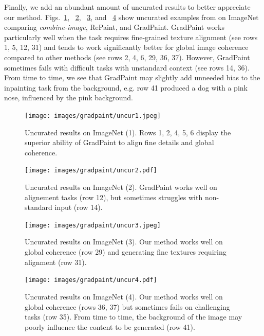  
     Finally, we add an abundant amount of uncurated results to better appreciate our method.
     Figs.~\ref{fig:uncur1}, ~\ref{fig:uncur2}, ~\ref{fig:uncur3}, and ~\ref{fig:uncur4} show uncurated 
     examples from on ImageNet comparing \emph{combine-image}, RePaint, and GradPaint. GradPaint works particularly well when the 
     task requires fine-grained texture alignment (see rows 1, 5, 12, 31)  and tends to work significantly better for global image 
     coherence compared to other methods (see rows 2, 4, 6, 29, 36, 37). However, GradPaint sometimes fails with difficult tasks with 
     unstandard context (see rows 14, 36). From time to time, we see that GradPaint may slightly add unneeded bias to the inpainting 
     task from the background, e.g. row 41 produced a dog with a pink nose, influenced by the pink background. 
  










\begin{figure}[H]
  \centering
    \texttt{[image: images/gradpaint/uncur1.jpeg]} %
    \caption{Uncurated results on ImageNet (1). Rows 1, 2, 4, 5, 6 display the superior ability of GradPaint to align fine details and global coherence.}
    \label{fig:uncur1}
\end{figure}

\begin{figure}[H]
  \centering
    \texttt{[image: images/gradpaint/uncur2.pdf]}
    \caption{Uncurated results on ImageNet (2). GradPaint works well on alignement tasks (row 12), but sometimes struggles with non-standard input (row 14). }
    \label{fig:uncur2}
\end{figure}

\begin{figure}[H]
  \centering
    \texttt{[image: images/gradpaint/uncur3.jpeg]}
    \caption{Uncurated results on ImageNet (3). Our method works well on global coherence (row 29) and generating fine textures requiring alignment (row 31).}
    \label{fig:uncur3}
\end{figure}

\begin{figure}[H]
  \centering
    \texttt{[image: images/gradpaint/uncur4.pdf]}
    \caption{Uncurated results on ImageNet (4). Our method works well on global coherence (rows 36, 37) but sometimes fails on challenging tasks (row 35). From time to time, the background of the image may poorly influence the content to be generated (row 41).}
    \label{fig:uncur4}
\end{figure}


